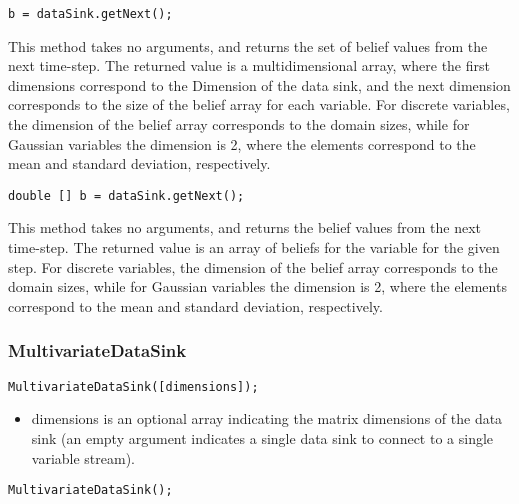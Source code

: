

\ifmatlab
\begin{lstlisting}
b = dataSink.getNext();
\end{lstlisting}

This method takes no arguments, and returns the set of belief values from the next time-step.  The returned value is a multidimensional array, where the first dimensions correspond to the Dimension of the data sink, and the next dimension corresponds to the size of the belief array for each variable.  For discrete variables, the dimension of the belief array corresponds to the domain sizes, while for Gaussian variables the dimension is 2, where the elements correspond to the mean and standard deviation, respectively.

\fi

\ifjava
\begin{lstlisting}
double [] b = dataSink.getNext();
\end{lstlisting}

This method takes no arguments, and returns the belief values from the next time-step.  The returned value is an array of beliefs for the variable for the given step.  For discrete variables, the dimension of the belief array corresponds to the domain sizes, while for Gaussian variables the dimension is 2, where the elements correspond to the mean and standard deviation, respectively.
\fi

\subsubsection{MultivariateDataSink}


\ifmatlab
\begin{lstlisting}
MultivariateDataSink([dimensions]);
\end{lstlisting}

\begin{itemize}
\item dimensions is an optional array indicating the matrix dimensions of the data sink (an empty argument indicates a single data sink to connect to a single variable stream).
\end{itemize}
\fi

\ifjava
\begin{lstlisting}
MultivariateDataSink();
\end{lstlisting}
\fi

